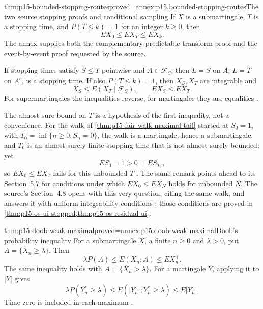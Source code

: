 \begin{hbtheorem}{thm:p15-bounded-stopping-routes}{proved=annex:p15.bounded-stopping-routes}{The two source stopping proofs and conditional sampling}
If \(X\) is a submartingale, \(T\) is a stopping time, and
\(P(T\leq k)=1\) for an integer
\(k\geq0\), then
\[
                         EX_0\leq EX_T\leq EX_k.
\]
The annex supplies both the complementary predictable-transform proof
and the event-by-event proof requested by the source.

If stopping times satisfy \(S\leq T\) pointwise and \(A\in\mathcal F_S\),
then \(L=S\) on \(A\), \(L=T\) on \(A^c\), is a stopping time.
If also \(P(T\leq k)=1\), then \(X_S,X_T\) are integrable and
\[
                      X_S\leq E(X_T\mid\mathcal F_S),\qquad
                      EX_S\leq EX_T.
\]
For supermartingales the inequalities reverse; for martingales they
are equalities \cite[thm.~4.4.1, exs.~4.4.1--4]{DurrettPTEAuthor2019}.

The almost-sure bound on \(T\) is a hypothesis of the first inequality,
not a convenience. For the walk of \cref{thm:p15-fair-walk-maximal-tail}
started at \(S_0=1\), with \(T_0=\inf\{n\geq0:S_n=0\}\), the walk is a
martingale, hence a submartingale, and \(T_0\) is an almost-surely finite
stopping time that is not almost surely bounded; yet
\[
                    ES_0=1>0=ES_{T_0},
\]
so \(EX_0\leq EX_T\) fails for this unbounded \(T\)
\cite[remark after thm.~4.4.1, p.~235]{DurrettPTEAuthor2019}.
The same remark points ahead to its Section~5.7 for conditions under
which \(EX_0\leq EX_N\) holds for unbounded \(N\). The source's
Section~4.8 opens with this very question, citing the same walk, and
answers it with uniform-integrability conditions
\cite[sec.~4.8, thms.~4.8.2--4.8.3, pp.~255--256]{DurrettPTEAuthor2019};
those conditions are proved in
\cref{thm:p15-os-ui-stopped,thm:p15-os-residual-ui}.
\end{hbtheorem}

\begin{hbtheorem}{thm:p15-doob-weak-maximal}{proved=annex:p15.doob-weak-maximal}{Doob's probability inequality}
For a submartingale \(X\), a finite \(n\geq0\) and \(\lambda>0\), put
\(A=\{\overline X_n\geq\lambda\}\). Then
\[
                         \lambda P(A)\leq E(X_n;A)\leq EX_n^+.
\]
The same inequality holds with \(A=\{\overline X_n>\lambda\}\).
For a martingale \(Y\), applying it to \(|Y|\) gives
\[
                  \lambda P(Y_n^*\geq\lambda)
                         \leq E(|Y_n|;Y_n^*\geq\lambda)
                         \leq E|Y_n|.
\]
Time zero is included in each maximum
\cite[thm.~4.4.2]{DurrettPTEAuthor2019}.
\end{hbtheorem}

